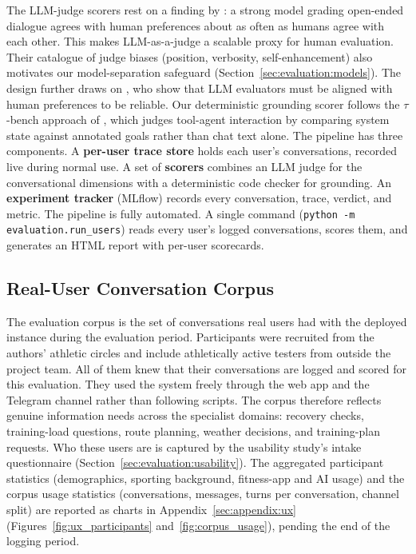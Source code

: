 The LLM-judge scorers rest on a finding by \cite{zheng_judging_2023}: a strong model grading open-ended dialogue agrees with human preferences about as often as humans agree with each other. This makes LLM-as-a-judge a scalable proxy for human evaluation. Their catalogue of judge biases (position, verbosity, self-enhancement) also motivates our model-separation safeguard (Section~\ref{sec:evaluation:models}). The design further draws on \cite{shankar_validates_2024}, who show that LLM evaluators must be aligned with human preferences to be reliable. Our deterministic grounding scorer follows the $\tau$-bench approach of \cite{yao_taubench_2024}, which judges tool-agent interaction by comparing system state against annotated goals rather than chat text alone. The pipeline has three components. A \textbf{per-user trace store} holds each user's conversations, recorded live during normal use. A set of \textbf{scorers} combines an LLM judge for the conversational dimensions with a deterministic code checker for grounding. An \textbf{experiment tracker} (MLflow) records every conversation, trace, verdict, and metric. The pipeline is fully automated. A single command (\texttt{python -m evaluation.run\_users}) reads every user's logged conversations, scores them, and generates an HTML report with per-user scorecards.

\subsection{Real-User Conversation Corpus}\label{sec:evaluation:corpus}

The evaluation corpus is the set of conversations real users had with the deployed instance during the evaluation period. Participants were recruited from the authors' athletic circles and include athletically active testers from outside the project team. All of them knew that their conversations are logged and scored for this evaluation. They used the system freely through the web app and the Telegram channel rather than following scripts. The corpus therefore reflects genuine information needs across the specialist domains: recovery checks, training-load questions, route planning, weather decisions, and training-plan requests. Who these users are is captured by the usability study's intake questionnaire (Section~\ref{sec:evaluation:usability}). The aggregated participant statistics (demographics, sporting background, fitness-app and AI usage) and the corpus usage statistics (conversations, messages, turns per conversation, channel split) are reported as charts in Appendix~\ref{sec:appendix:ux} (Figures~\ref{fig:ux_participants} and~\ref{fig:corpus_usage}), pending the end of the logging period.

